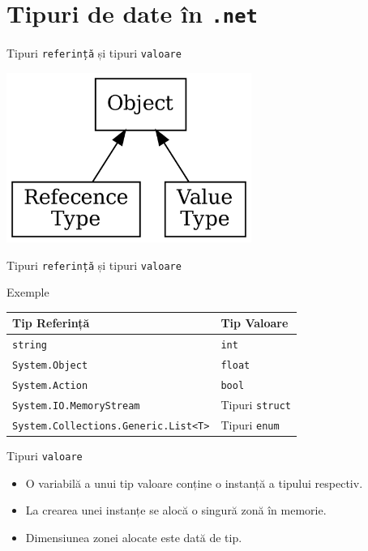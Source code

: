 \documentclass[presentation]{beamer}
\begin{document}
\section{Tipuri de date în \texttt{.net}}
\label{sec:orga421f53}
\begin{frame}[label={sec:org5a91410},fragile]{Tipuri \texttt{referință} și tipuri \texttt{valoare}}
 \begin{center}
\includegraphics[width=0.6\textwidth]{./img/netcore-types.png}
\end{center}
\end{frame}
\begin{frame}[label={sec:org3b50e3e},fragile]{Tipuri \texttt{referință} și tipuri \texttt{valoare}}
 \begin{block}{Exemple}
\begin{center}
\begin{tabular}{ll}
Tip Referință & Tip Valoare\\
\hline
\texttt{string} & \texttt{int}\\
\texttt{System.Object} & \texttt{float}\\
\texttt{System.Action} & \texttt{bool}\\
\texttt{System.IO.MemoryStream} & Tipuri \texttt{struct}\\
\texttt{System.Collections.Generic.List<T>} & Tipuri \texttt{enum}\\
\end{tabular}
\end{center}
\end{block}
\end{frame}
\begin{frame}[label={sec:org7488388},fragile]{Tipuri \texttt{valoare}}
 \begin{itemize}
\item O variabilă a unui tip valoare conține o instanță a tipului respectiv.
\item La crearea unei instanțe se alocă o singură zonă în memorie.
\item Dimensiunea zonei alocate este dată de tip.
\end{itemize}
\end{frame}
\end{document}
